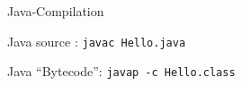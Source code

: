 %
\begin{Frame}{Java-Compilation}
      \begin{block}{Java source : \texttt{javac Hello.java}}
        
      \end{block} 
    
      \begin{block}{Java ``Bytecode'': \texttt{javap -c Hello.class}}
        
      \end{block}   
\end{Frame}


